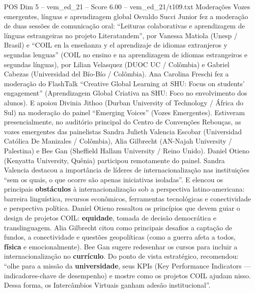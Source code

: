 \begin{textsample}{POS Dim 5 – vem\_ed\_21 – Score 6.00 – vem\_ed\_21/t109.txt}  \label{ex:f5_pos_085}
Moderações Vozes emergentes, línguas e aprendizagem global Osvaldo Succi Junior fez a moderação de duas sessões de comunicação oral: “Leituras colaborativas e aprendizagem de línguas estrangeiras no projeto Literatandem”, por Vanessa Matiola (Unesp / Brasil) e “COIL en la enseñanza y el aprendizaje de idiomas extranjeros y segundas lenguas” (COIL no ensino e na aprendizagem de idiomas estrangeiros e segundas línguas), por Lilian Velasquez (DUOC UC / Colômbia) e Gabriel Cabezas (Universidad del Bío-Bío / Colômbia).
Ana Carolina Freschi fez a moderação do FlashTalk “Creative Global Learning at SHU: Focus on students’ engagement” (Aprendizagem Global Criativa na SHU: Foco no envolvimento dos alunos).
E apoiou Divinia Jithoo (Durban University of Technology / África do Sul) na moderação do painel “Emerging Voices” (Vozes Emergentes).
Estiveram presencialmente, no auditório principal do Centro de Convenções Rebouças, as vozes emergentes das painelistas Sandra Julieth Valencia Escobar (Universidad Católica De Manizales / Colômbia), Alia Gilbrecht (AN-Najah University / Palestina) e Bee Gan (Sheffield Hallam University / Reino Unido).
Daniel Otieno (Kenyatta University, Quênia) participou remotamente do painel.
Sandra Valencia destacou a importância de líderes de internacionalização nas instituições “sem os quais, o que ocorre são apenas iniciativas isoladas”.
E elencou os principais \textbf{obstáculos} à internacionalização sob a perspectiva latino-americana: barreira linguística, recursos econômicos, ferramentas tecnológicas e conectividade e perspectiva política.
Daniel Otieno ressaltou os princípios que devem guiar o design de projetos COIL: \textbf{equidade}, tomada de decisão democrática e translinguagem.
Alia Gilbrecht citou como principais desafios a captação de fundos, a conectividade e questões geopolíticas (como a guerra afeta a todos, \textbf{física} e emocionalmente).
Bee Gan sugere redesenhar os cursos para incluir a internacionalização no \textbf{currículo}.
Do ponto de vista estratégico, recomendou: “olhe para a missão da \textbf{universidade}, seus KPIs (Key Performance Indicators — indicadores-chave de desempenho) e mostre como os projetos COIL ajudam nisso.
Dessa forma, os Intercâmbios Virtuais ganham adesão institucional”.

\end{textsample}

